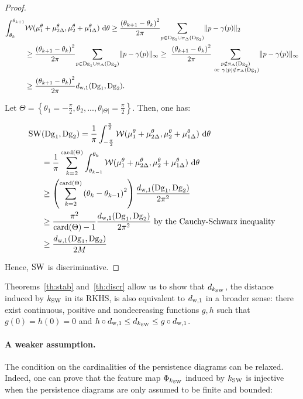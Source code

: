 \begin{proof}
\begin{align}
\int_{\theta_k}^{\theta_{k+1}} &\mathcal W(\mu_1^\theta+\mu_{2\Delta}^\theta,\mu_2^\theta+\mu_{1\Delta}^\theta)\ {\rm d}\theta
\geq \frac{\left(\theta_{k+1}-\theta_k\right)^2}{2\pi}\underset{p\in \dg_1\cup\pi_\Delta(\dg_2)}{\sum}\|p-\gamma(p)\|_2\nonumber\\
&\geq \frac{\left(\theta_{k+1}-\theta_k\right)^2}{2\pi}\underset{p\in \dg_1\cup\pi_\Delta(\dg_2)}{\sum}\|p-\gamma(p)\|_\infty\geq\
\frac{\left(\theta_{k+1}-\theta_k\right)^2}{2\pi}\underset{\substack{ p\notin \pi_\Delta(\dg_2) \\ {\rm\ or\ }\gamma(p)\notin\pi_\Delta(\dg_1)} }{\sum}\|p-\gamma(p)\|_\infty\nonumber\\
&\geq \frac{\left(\theta_{k+1}-\theta_k\right)^2}{2\pi}\distw{1}(\dg_1,\dg_2).
\nonumber
\end{align}

Let $\Theta=\left\{\theta_1=-\frac{\pi}{2},\theta_2,...,\theta_{|\Theta|}=\frac{\pi}{2}\right\}$. Then, one has:

\begin{align}
\SW&(\dg_1,\dg_2)=\frac{1}{\pi}\int_{-\frac{\pi}{2}}^{\frac{\pi}{2}} \mathcal W(\mu_1^\theta+\mu_{2\Delta}^\theta,\mu_2^\theta+\mu_{1\Delta}^\theta)\ {\rm d}\theta\nonumber\\
&=\frac{1}{\pi}\sum_{k=2}^{\card(\Theta)}\int_{\theta_{k-1}}^{\theta_{k}} \mathcal W(\mu_1^\theta+\mu_{2\Delta}^\theta,\mu_2^\theta+\mu_{1\Delta}^\theta)\ 	{\rm d}\theta\nonumber\\
&\geq \left(\sum_{k=2}^{\card(\Theta)}\left(\theta_{k}-\theta_{k-1}\right)^2\right)\frac{\distw{1}(\dg_1,\dg_2)}{2\pi^2} \nonumber\\
&\geq \frac{\pi^2}{\card(\Theta)-1}\frac{\distw{1}(\dg_1,\dg_2)}{2\pi^2}\text{ by the Cauchy-Schwarz inequality} \nonumber\\
&\geq \frac{\distw{1}(\dg_1,\dg_2)}{2M}
\nonumber
\end{align}

Hence, ${\rm SW}$ is discriminative.
\end{proof}

Theorems~\ref{th:stab} and~\ref{th:discr} allow us to show that $d_{k_{\rm SW}}$, the distance induced by $k_{\rm SW}$ in its RKHS,
is also equivalent to $d_{{\rm w},1}$ in a broader sense: there exist continuous, positive and nondecreasing functions $g,h$ such that $g(0)=h(0)=0$
and $h\circ d_{{\rm w},1}\leq d_{k_{\rm SW}}\leq g\circ d_{{\rm w},1}$.
 
\paragraph*{A weaker assumption.} The condition on the cardinalities of the persistence diagrams can be relaxed. 
Indeed, one can prove that the feature map $\Phi_{k_{\rm SW}}$ induced by $k_{\rm SW}$ 
is injective when the persistence diagrams are only assumed to be finite and bounded:

